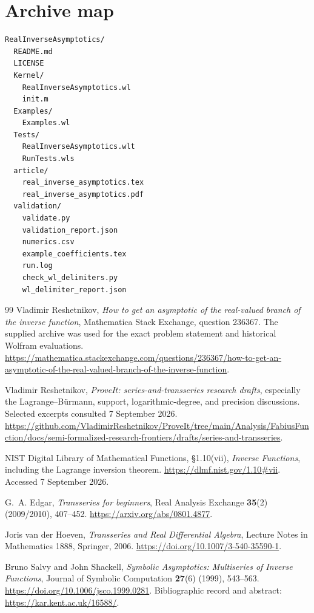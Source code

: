 \documentclass[11pt,a4paper]{article}
\numberwithin{equation}{section}
\theoremstyle{definition}\newtheorem{definition}[theorem]{Definition}
\theoremstyle{remark}\newtheorem{remark}[theorem]{Remark}
\begin{document}
\section{Archive map}
\begin{lstlisting}[language={},basicstyle=\small\ttfamily]
RealInverseAsymptotics/
  README.md
  LICENSE
  Kernel/
    RealInverseAsymptotics.wl
    init.m
  Examples/
    Examples.wl
  Tests/
    RealInverseAsymptotics.wlt
    RunTests.wls
  article/
    real_inverse_asymptotics.tex
    real_inverse_asymptotics.pdf
  validation/
    validate.py
    validation_report.json
    numerics.csv
    example_coefficients.tex
    run.log
    check_wl_delimiters.py
    wl_delimiter_report.json
\end{lstlisting}

\begin{thebibliography}{99}
Vladimir Reshetnikov,
\emph{How to get an asymptotic of the real-valued branch of the inverse function},
Mathematica Stack Exchange, question 236367.
The supplied archive was used for the exact problem statement and historical
Wolfram evaluations.
\url{https://mathematica.stackexchange.com/questions/236367/how-to-get-an-asymptotic-of-the-real-valued-branch-of-the-inverse-function}.

Vladimir Reshetnikov, \emph{ProveIt: series-and-transseries research drafts},
especially the Lagrange--B\"urmann, support, logarithmic-degree, and
precision discussions. Selected excerpts consulted 7 September 2026.
\url{https://github.com/VladimirReshetnikov/ProveIt/tree/main/Analysis/FabiusFunction/docs/semi-formalized-research-frontiers/drafts/series-and-transseries}.

NIST Digital Library of Mathematical Functions,
\S1.10(vii), \emph{Inverse Functions}, including the Lagrange inversion theorem.
\url{https://dlmf.nist.gov/1.10#vii}. Accessed 7 September 2026.

G.~A. Edgar, \emph{Transseries for beginners},
Real Analysis Exchange \textbf{35}(2) (2009/2010), 407--452.
\url{https://arxiv.org/abs/0801.4877}.

Joris van der Hoeven, \emph{Transseries and Real Differential Algebra},
Lecture Notes in Mathematics 1888, Springer, 2006.
\url{https://doi.org/10.1007/3-540-35590-1}.

Bruno Salvy and John Shackell,
\emph{Symbolic Asymptotics: Multiseries of Inverse Functions},
Journal of Symbolic Computation \textbf{27}(6) (1999), 543--563.
\url{https://doi.org/10.1006/jsco.1999.0281}.
Bibliographic record and abstract:
\url{https://kar.kent.ac.uk/16588/}.


\end{thebibliography}
\end{document}
